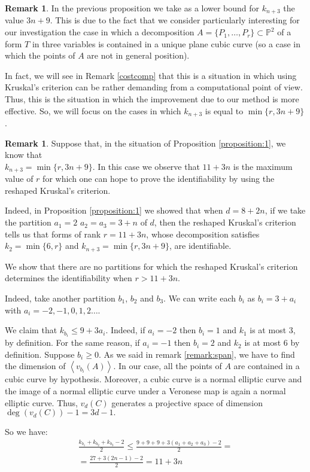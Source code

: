 \documentclass[a4paper,10pt,oneside]{article}
\theoremstyle{casep}
\newcommand{\Pj}{\mathbb{P}}
\theoremstyle{definition}
\newtheorem{remark}[theorem]{Remark}
\begin{document}
\begin{remark}
In the previous proposition we take as a lower bound for $ k_{n+3} $ the value $ 3n+9 $. This is due to the fact that we consider particularly interesting for our investigation the case in which a decomposition $ A=\{P_1,\dots ,P_r\} \subset \Pj^2 $ of a form $ T $ in three variables is contained in a unique plane cubic curve (so a case in which the points of $ A $ are not in general position). 

In fact, we will see in Remark \ref{costcomp} that this is a situation in which using Kruskal's criterion can be rather demanding from a computational point of view. Thus, this is the situation in which the improvement due to our method is more effective. So, we will focus on the cases in which $ k_{n+3} $ is equal to $ \min\{ r,3n+9 \} $.
\end{remark}
 
\begin{remark}
Suppose that, in the situation of Proposition \ref{proposition:1}, we know that \\ $ k_{n+3}=\min \{ r,3n+9\} $. In this case we observe that $11+3n$ is the maximum value of $r$ for which one can hope to prove the identifiability by using the reshaped Kruskal's criterion.

Indeed, in Proposition \ref{proposition:1} we showed that when $d=8+2n$, if we take the partition $a_1=2$ $a_2=a_3=3+n$
of $d$, then the reshaped Kruskal's criterion tells us that forms of rank $r=11+3n$, whose decomposition satisfies $k_2=\min\{6,r \}$ 
and $k_{n+3}=\min\{r,3n+9 \}$, are identifiable.

We show that there are no partitions for which the reshaped Kruskal's criterion determines the identifiability when $r > 11+3n$.

Indeed, take another partition $b_1$, $b_2$ and $b_3$. We can write each $b_i$ as $b_i=3+a_i$ with $a_i= -2, -1,0,1,2 \dots $.

We claim that $k_{b_i} \leq 9+3a_i $.
Indeed, if $a_i=-2$ then $b_i=1$ and $k_1$ is at most $3$, by definition. For the same reason, if $a_i=-1$ then $b_i=2$ 
and $k_2$ is at most $6$ by definition. 
Suppose $b_i \geq 0$. As we said in remark \ref{remark:span}, we have to find the dimension of $\left\langle v_{b_i}(A) \right\rangle$.
In our case, all the points of $A$ are contained in a cubic curve by hypothesis. Moreover, a cubic curve is a normal elliptic curve and the image of a normal elliptic curve under a Veronese map is again a normal elliptic curve. Thus, $v_d(C)$ generates a projective space of dimension $ \deg(v_d(C))-1= 3d-1.$

So we have: \begin{multline*}\frac{k_{b_1} + k_{b_2} + k_{b_3}-2}{2} \leq \frac{9+9+9 + 3(a_1+a_2+a_3)-2}{2} = \\ =\frac{27+3(2n-1)-2}{2}=11+3n 
\end{multline*}
\end{remark}
\end{document}
